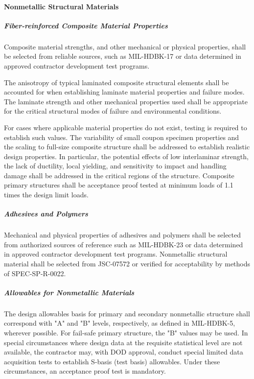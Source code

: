 \documentclass[12pt]{article}
\begin{document}
\paragraph{Nonmetallic Structural Materials} %
\subparagraph{Fiber-reinforced Composite Material Properties} %
Composite material strengths, and other mechanical or physical properties, shall be selected from reliable sources, such as MIL-HDBK-17 or data determined in approved contractor development test programs.

The anisotropy of typical laminated composite structural elements shall be accounted for when establishing laminate material properties and failure modes. 
The laminate strength and other mechanical properties used shall be appropriate for the critical structural modes of failure and environmental conditions.

For cases where applicable material properties do not exist, testing is required to establish such values. 
The variability of small coupon specimen properties and the scaling to full-size composite structure shall be addressed to establish realistic design properties. 
In particular, the potential effects of low interlaminar strength, the lack of ductility, local yielding, and sensitivity to impact and handling damage shall be addressed in the critical regions of the structure. 
Composite primary structures shall be acceptance proof tested at minimum loads of 1.1 times the design limit loads.

\subparagraph{Adhesives and Polymers} %
Mechanical and physical properties of adhesives and polymers shall be selected from authorized sources of reference such as MIL-HDBK-23 or data determined in approved contractor development test programs.
Nonmetallic structural material shall be selected from JSC-07572 or verified for acceptability by methods of SPEC-SP-R-0022.

\subparagraph{Allowables for Nonmetallic Materials} %
The design allowables basis for primary and secondary nonmetallic structure shall correspond with "A" and "B" levels, respectively, as defined in MIL-HDBK-5, wherever possible. 
For fail-safe primary structure, the "B" values may be used. 
In special circumstances where design data at the requisite statistical level are not available, the contractor may, with DOD approval, conduct special limited data acquisition tests to establish S-basis (test basis) allowables. 
Under these circumstances, an acceptance proof test is mandatory.
\end{document}
